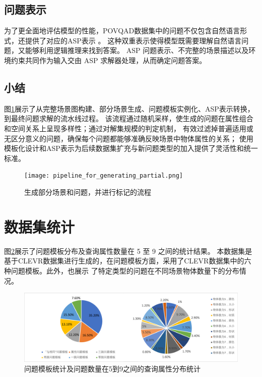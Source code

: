\subsection{问题表示}
为了更全面地评估模型的性能，POVQAD数据集中的问题不仅包含自然语言形式，还提供了对应的ASP表示 。
这种双重表示使得模型既需要理解自然语言问题，又能够利用逻辑推理来找到答案。
ASP 问题表示、不完整的场景描述以及环境约束共同作为输入交由 ASP 求解器处理，从而确定问题答案。
\subsection{小结}
图\ref{pipeline_for_generating_partial}展示了从完整场景图构建、部分场景生成、问题模板实例化、ASP表示转换，到最终问题求解的流水线过程。
该流程通过随机采样，使生成的问题在属性组合和空间关系上呈现多样性；通过对解集规模的判定机制，
有效过滤掉普遍适用或无区分意义的问题，确保每个问题都能够准确反映场景中物体属性的关系；
使用模板化设计和ASP表示为后续数据集扩充与新问题类型的加入提供了灵活性和统一标准。
\begin{figure}[h]
    \centering
    \texttt{[image: pipeline\_for\_generating\_partial.png]}
    \caption{生成部分场景和问题，并进行标记的流程}
    \label{pipeline_for_generating_partial}
\end{figure}
\section{数据集统计}
图\ref{fig:template_statistics}展示了问题模板分布及查询属性数量在 5 至 9 之间的统计结果。
本数据集是基于CLEVR数据集进行生成的，在问题模板方面，采用了CLEVR数据集中的六种问题模板。此外，也展示
了特定类型的问题在不同场景物体数量下的分布情况。
\begin{figure}[h]
    \includegraphics[width=\textwidth]{figures/template_combined-crop.pdf}
    \caption{问题模板统计及问题数量在5到9之间的查询属性分布统计}
    \label{fig:template_statistics}
\end{figure}


